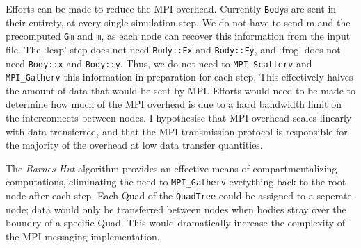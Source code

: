 \documentclass[11pt,a4paper]{article}
\begin{document}
Efforts can be made to reduce the MPI overhead. Currently \texttt{Body}s are sent in their entirety, at every single simulation step. We do not have to send m and the precomputed \texttt{Gm} and \texttt{m}, as each node can recover this information from the input file. The `leap' step does not need \texttt{Body::Fx} and \texttt{Body::Fy}, and `frog' does not need \texttt{Body::x} and \texttt{Body::y}. Thus, we do not need to \texttt{MPI\_Scatterv} and \texttt{MPI\_Gatherv} this information in preparation for each step. This effectively halves the amount of data that would be sent by MPI. Efforts would need to be made to determine how much of the MPI overhead is due to a hard bandwidth limit on the interconnects between nodes. I hypothesise that MPI overhead scales linearly with data transferred, and that the MPI transmission protocol is responsible for the majority of the overhead at low data transfer quantities. 

The \textit{Barnes-Hut} algorithm provides an effective means of compartmentalizing computations, eliminating the need to \texttt{MPI\_Gatherv} evetything back to the root node after each step. Each Quad of the \texttt{QuadTree} could be assigned to a seperate node; data would only be transferred between nodes when bodies stray over the boundry of a specific Quad. This would dramatically increase the complexity of the MPI messaging implementation.



\end{document}
